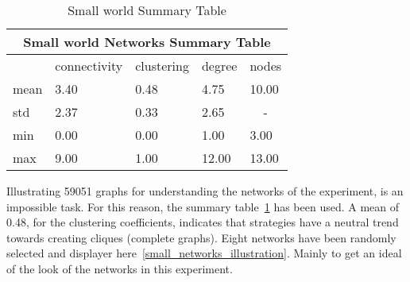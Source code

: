 \begin{table}[!hbtp]
	\centering
	\begin{adjustbox}{width=0.6\textwidth}
		\small
		\begin{tabular}{|l|l|l|l|l|}
			\hline
			\multicolumn{5}{|c|}{Small world Networks Summary Table}                  \\ \hline
			     & connectivity & clustering & degree & nodes                  \\ \hline
			mean & 3.40         & 0.48       & 4.75   & 10.00                  \\ \hline
			std  & 2.37         & 0.33       & 2.65   & \multicolumn{1}{c|}{-} \\ \hline
			min  & 0.00         & 0.00       & 1.00   & 3.00                   \\ \hline
			max  & 9.00         & 1.00       & 12.00  & 13.00                  \\ \hline
		\end{tabular}
	\end{adjustbox}
	\caption{Small world Summary Table}
	\label{small-world-summary-table}
\end{table}

Illustrating 59051 graphs for understanding the networks of the experiment, is
an impossible task. For this reason, the summary table~\ref{small-world-summary-table}
has been used. A mean of 0.48, for the clustering coefficients, indicates
that strategies have a neutral trend towards creating cliques (complete graphs).
Eight networks have been randomly selected and
displayer here~\ref{small_networks_illustration}. Mainly to get an ideal of the
look of the networks in this experiment.

